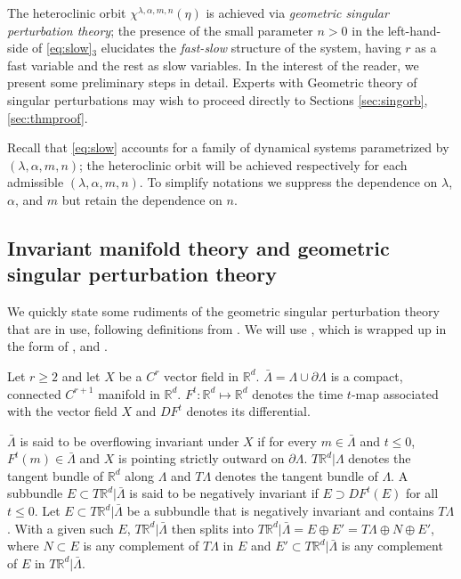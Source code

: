 \documentclass[a4paper,11pt]{article}
\theoremstyle{remark}
\begin{document}
The heteroclinic orbit $\chi^{\lambda,\alpha,m,n}(\eta)$ is achieved via {\it geometric singular perturbation theory}; the presence of the small parameter $n>0$ in the left-hand-side of \eqref{eq:slow}$_3$ elucidates the {\it fast-slow} structure of the system, having $r$ as a fast variable and the rest as slow variables.  
In the interest of the reader, we present some preliminary steps in detail. Experts with Geometric theory of singular
perturbations may wish to proceed directly to Sections \ref{sec:singorb}, \ref{sec:thmproof}. 

Recall that \eqref{eq:slow} accounts for a family of dynamical systems parametrized by $(\lambda,\alpha,m,n)$; the heteroclinic orbit will be achieved respectively for each admissible $(\lambda,\alpha,m,n)$. To simplify notations we suppress the dependence on $\lambda$, $\alpha$, and $m$ but retain
the dependence on $n$.

\subsection{Invariant manifold theory and geometric singular perturbation theory}\label{sec:singpert}
We quickly state some rudiments of the geometric singular perturbation theory that are in use, following definitions from \cite{fenichel_asymptotic_1977,fenichel_geometric_1979}. %
We will use \cite[Theorem 12.2]{fenichel_geometric_1979}, which is wrapped up in the form of \cite[Theorem 2.2]{Sz1991}, and \cite[Theorem 3.1]{Sz1991}.

Let $r\ge2$ and let $X$ be a $C^{r}$ vector field in $\mathbb{R}^d$. $\bar{\Lambda}=\Lambda \cup \partial \Lambda$ is a compact, connected $C^{r+1}$ manifold in $\mathbb{R}^d$. $F^t: \mathbb{R}^d \mapsto \mathbb{R}^d$ denotes the time $t$-map associated with the vector field $X$ and $DF^t$ denotes its differential. 

$\bar{\Lambda}$ is said to be overflowing invariant under $X$ if for every $m\in\bar{\Lambda}$ and $t\le0$, $F^t(m)\in \bar{\Lambda}$ and $X$ is pointing strictly outward on $\partial \Lambda$. $T \mathbb{R}^d|\Lambda$ denotes the tangent bundle of $\mathbb{R}^d$ along $\Lambda$ and $T\Lambda$ denotes the tangent bundle of $\Lambda$. A subbundle $E\subset T\mathbb{R}^d|\bar{\Lambda}$ is said to be negatively invariant if $E\supset DF^t(E)$ for all $t\le0$. Let $E\subset T\mathbb{R}^d|\bar{\Lambda}$ be a subbundle that is negatively invariant and contains $T\Lambda$. With a given such $E$,  $T \mathbb{R}^d|\bar\Lambda$ then splits into $T\mathbb{R}^d|\bar{\Lambda} =E\oplus E'= T\Lambda\oplus N\oplus E'$, where $N\subset E$ is any complement of $T\Lambda$ in $E$ and $E'\subset T\mathbb{R}^d|\bar{\Lambda}$ is any complement of $E$ in $T\mathbb{R}^d|\bar{\Lambda}$.  
\end{document}
